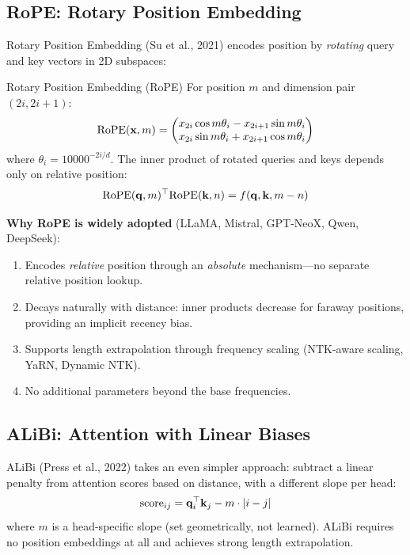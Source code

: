 \subsection{RoPE: Rotary Position Embedding}
\label{sec:rope}

Rotary Position Embedding (Su et al., 2021) encodes position by
\emph{rotating} query and key vectors in 2D subspaces:

\begin{mathresult}{Rotary Position Embedding (RoPE)}
For position $m$ and dimension pair $(2i, 2i+1)$:
\[
    \text{RoPE}(\mathbf{x}, m) = \begin{pmatrix} x_{2i} \cos m\theta_i - x_{2i+1} \sin m\theta_i \\
                                           x_{2i} \sin m\theta_i + x_{2i+1} \cos m\theta_i \end{pmatrix}
\]
where $\theta_i = 10000^{-2i/d}$.  The inner product of rotated queries and
keys depends only on relative position:
\[
    \text{RoPE}(\mathbf{q}, m)^\top \text{RoPE}(\mathbf{k}, n) = f(\mathbf{q}, \mathbf{k}, m - n)
\]
\end{mathresult}

\textbf{Why RoPE is widely adopted} (LLaMA, Mistral, GPT-NeoX, Qwen, DeepSeek):
\begin{enumerate}
    \item Encodes \emph{relative} position through an \emph{absolute}
          mechanism---no separate relative position lookup.
    \item Decays naturally with distance: inner products decrease for faraway
          positions, providing an implicit recency bias.
    \item Supports length extrapolation through frequency scaling (NTK-aware
          scaling, YaRN, Dynamic NTK).
    \item No additional parameters beyond the base frequencies.
\end{enumerate}

\subsection{ALiBi: Attention with Linear Biases}

ALiBi (Press et al., 2022) takes an even simpler approach: subtract a linear
penalty from attention scores based on distance, with a different slope per head:
\[
    \text{score}_{ij} = \mathbf{q}_i^\top \mathbf{k}_j - m \cdot |i - j|
\]
where $m$ is a head-specific slope (set geometrically, not learned).  ALiBi
requires no position embeddings at all and achieves strong length extrapolation.

